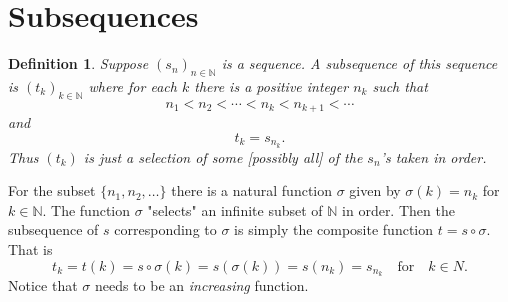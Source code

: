 \documentclass[12pt, lettersize]{book}
\newtheorem{dfn}[thm]{Definition}
\begin{document}
	\section{Subsequences}
		\begin{dfn}
		Suppose $(s_n)_{n\in\mathbb{N}}$ is a sequence. A \emph{subsequence} of this sequence is $(t_k)_{k\in\mathbb{N}}$ where for each $k$ there is a positive integer $n_k$ such that
		\begin{equation*}
			n_1<n_2<\cdots<n_k<n_{k+1}<\cdots
		\end{equation*}
		and
		\begin{equation*}
			t_k=s_{n_k}.
		\end{equation*}
		Thus $(t_k)$ is just a selection of some [possibly all] of the $s_n$'s taken in order.
		\end{dfn}
		For the subset $\{n_1,n_2,\dots\}$ there is a natural function $\sigma$ given by $\sigma(k)=n_k$ for $k\in\mathbb{N}$. The function $\sigma$ "selects" an infinite subset of $\mathbb{N}$ in order. Then
		the subsequence of $s$ corresponding to $\sigma$ is simply the composite function $t=s\circ\sigma$. That is
		\begin{displaymath}
			t_k=t(k)=s\circ\sigma(k)=s(\sigma(k))=s(n_k)=s_{n_k}\quad\text{for}\quad k\in N.
		\end{displaymath}
		Notice that $\sigma$ needs to be an \emph{increasing} function. 
		
\end{document}
